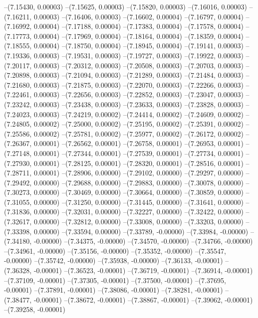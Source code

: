 --(7.15430, 0.00003)
--(7.15625, 0.00003)
--(7.15820, 0.00003)
--(7.16016, 0.00003)
--(7.16211, 0.00003)
--(7.16406, 0.00003)
--(7.16602, 0.00004)
--(7.16797, 0.00004)
--(7.16992, 0.00004)
--(7.17188, 0.00004)
--(7.17383, 0.00004)
--(7.17578, 0.00004)
--(7.17773, 0.00004)
--(7.17969, 0.00004)
--(7.18164, 0.00004)
--(7.18359, 0.00004)
--(7.18555, 0.00004)
--(7.18750, 0.00004)
--(7.18945, 0.00004)
--(7.19141, 0.00003)
--(7.19336, 0.00003)
--(7.19531, 0.00003)
--(7.19727, 0.00003)
--(7.19922, 0.00003)
--(7.20117, 0.00003)
--(7.20312, 0.00003)
--(7.20508, 0.00003)
--(7.20703, 0.00003)
--(7.20898, 0.00003)
--(7.21094, 0.00003)
--(7.21289, 0.00003)
--(7.21484, 0.00003)
--(7.21680, 0.00003)
--(7.21875, 0.00003)
--(7.22070, 0.00003)
--(7.22266, 0.00003)
--(7.22461, 0.00003)
--(7.22656, 0.00003)
--(7.22852, 0.00003)
--(7.23047, 0.00003)
--(7.23242, 0.00003)
--(7.23438, 0.00003)
--(7.23633, 0.00003)
--(7.23828, 0.00003)
--(7.24023, 0.00003)
--(7.24219, 0.00002)
--(7.24414, 0.00002)
--(7.24609, 0.00002)
--(7.24805, 0.00002)
--(7.25000, 0.00002)
--(7.25195, 0.00002)
--(7.25391, 0.00002)
--(7.25586, 0.00002)
--(7.25781, 0.00002)
--(7.25977, 0.00002)
--(7.26172, 0.00002)
--(7.26367, 0.00001)
--(7.26562, 0.00001)
--(7.26758, 0.00001)
--(7.26953, 0.00001)
--(7.27148, 0.00001)
--(7.27344, 0.00001)
--(7.27539, 0.00001)
--(7.27734, 0.00001)
--(7.27930, 0.00001)
--(7.28125, 0.00001)
--(7.28320, 0.00001)
--(7.28516, 0.00001)
--(7.28711, 0.00001)
--(7.28906, 0.00000)
--(7.29102, 0.00000)
--(7.29297, 0.00000)
--(7.29492, 0.00000)
--(7.29688, 0.00000)
--(7.29883, 0.00000)
--(7.30078, 0.00000)
--(7.30273, 0.00000)
--(7.30469, 0.00000)
--(7.30664, 0.00000)
--(7.30859, 0.00000)
--(7.31055, 0.00000)
--(7.31250, 0.00000)
--(7.31445, 0.00000)
--(7.31641, 0.00000)
--(7.31836, 0.00000)
--(7.32031, 0.00000)
--(7.32227, 0.00000)
--(7.32422, 0.00000)
--(7.32617, 0.00000)
--(7.32812, 0.00000)
--(7.33008, 0.00000)
--(7.33203, 0.00000)
--(7.33398, 0.00000)
--(7.33594, 0.00000)
--(7.33789, -0.00000)
--(7.33984, -0.00000)
--(7.34180, -0.00000)
--(7.34375, -0.00000)
--(7.34570, -0.00000)
--(7.34766, -0.00000)
--(7.34961, -0.00000)
--(7.35156, -0.00000)
--(7.35352, -0.00000)
--(7.35547, -0.00000)
--(7.35742, -0.00000)
--(7.35938, -0.00000)
--(7.36133, -0.00001)
--(7.36328, -0.00001)
--(7.36523, -0.00001)
--(7.36719, -0.00001)
--(7.36914, -0.00001)
--(7.37109, -0.00001)
--(7.37305, -0.00001)
--(7.37500, -0.00001)
--(7.37695, -0.00001)
--(7.37891, -0.00001)
--(7.38086, -0.00001)
--(7.38281, -0.00001)
--(7.38477, -0.00001)
--(7.38672, -0.00001)
--(7.38867, -0.00001)
--(7.39062, -0.00001)
--(7.39258, -0.00001)
